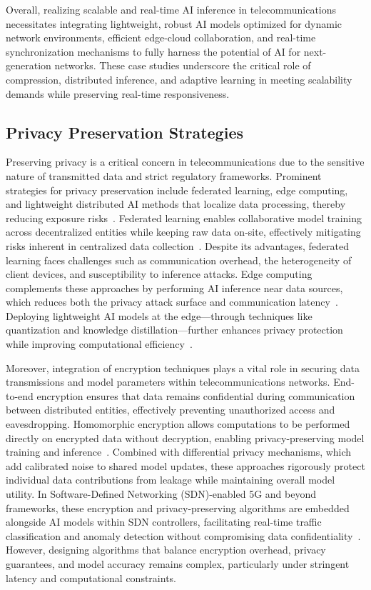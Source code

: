 \documentclass[sigconf]{acmart}
\begin{document}
Overall, realizing scalable and real-time AI inference in telecommunications necessitates integrating lightweight, robust AI models optimized for dynamic network environments, efficient edge-cloud collaboration, and real-time synchronization mechanisms to fully harness the potential of AI for next-generation networks. These case studies underscore the critical role of compression, distributed inference, and adaptive learning in meeting scalability demands while preserving real-time responsiveness.

\subsection{Privacy Preservation Strategies}

Preserving privacy is a critical concern in telecommunications due to the sensitive nature of transmitted data and strict regulatory frameworks. Prominent strategies for privacy preservation include federated learning, edge computing, and lightweight distributed AI methods that localize data processing, thereby reducing exposure risks~\cite{ref48,ref49,ref50,ref52}. Federated learning enables collaborative model training across decentralized entities while keeping raw data on-site, effectively mitigating risks inherent in centralized data collection~\cite{ref49}. Despite its advantages, federated learning faces challenges such as communication overhead, the heterogeneity of client devices, and susceptibility to inference attacks. Edge computing complements these approaches by performing AI inference near data sources, which reduces both the privacy attack surface and communication latency~\cite{ref52}. Deploying lightweight AI models at the edge—through techniques like quantization and knowledge distillation—further enhances privacy protection while improving computational efficiency~\cite{ref50}.

Moreover, integration of encryption techniques plays a vital role in securing data transmissions and model parameters within telecommunications networks. End-to-end encryption ensures that data remains confidential during communication between distributed entities, effectively preventing unauthorized access and eavesdropping. Homomorphic encryption allows computations to be performed directly on encrypted data without decryption, enabling privacy-preserving model training and inference~\cite{ref50}. Combined with differential privacy mechanisms, which add calibrated noise to shared model updates, these approaches rigorously protect individual data contributions from leakage while maintaining overall model utility. In Software-Defined Networking (SDN)-enabled 5G and beyond frameworks, these encryption and privacy-preserving algorithms are embedded alongside AI models within SDN controllers, facilitating real-time traffic classification and anomaly detection without compromising data confidentiality~\cite{ref52}. However, designing algorithms that balance encryption overhead, privacy guarantees, and model accuracy remains complex, particularly under stringent latency and computational constraints.
\end{document}

